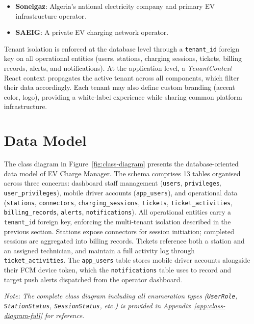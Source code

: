 \documentclass[12pt,a4paper]{report}
\begin{document}
\begin{itemize}
  \item \textbf{Sonelgaz}: Algeria's national electricity company and primary EV infrastructure
        operator.
  \item \textbf{SAEIG}: A private EV charging network operator.
\end{itemize}

Tenant isolation is enforced at the database level through a \texttt{tenant\_id} foreign key on
all operational entities (users, stations, charging sessions, tickets, billing records, alerts,
and notifications). At the
application level, a \textit{TenantContext} React context propagates the active tenant across
all components, which filter their data accordingly. Each tenant may also define custom branding
(accent color, logo), providing a white-label experience while sharing common platform
infrastructure.

\section{Data Model}

The class diagram in Figure~\ref{fig:class-diagram} presents the database-oriented data model
of EV Charge Manager. The schema comprises 13 tables organised across three concerns:
dashboard staff management (\texttt{users}, \texttt{privileges}, \texttt{user\_privileges}),
mobile driver accounts (\texttt{app\_users}), and operational data (\texttt{stations},
\texttt{connectors}, \texttt{charging\_sessions}, \texttt{tickets}, \texttt{ticket\_activities},
\texttt{billing\_records}, \texttt{alerts}, \texttt{notifications}). All operational entities
carry a \texttt{tenant\_id} foreign key, enforcing the multi-tenant isolation described in the
previous section. Stations expose connectors for session initiation; completed sessions are
aggregated into billing records. Tickets reference both a station and an assigned technician,
and maintain a full activity log through \texttt{ticket\_activities}. The \texttt{app\_users}
table stores mobile driver accounts alongside their FCM device token, which the
\texttt{notifications} table uses to record and target push alerts dispatched from the operator
dashboard.

\medskip
\noindent\textit{Note: The complete class diagram including all enumeration types
(\texttt{UserRole}, \texttt{StationStatus}, \texttt{SessionStatus}, etc.) is provided in
Appendix~\ref{app:class-diagram-full} for reference.}
\end{document}
